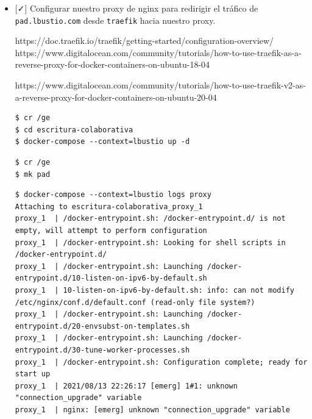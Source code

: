 \documentclass[
  12,
]{scrartcl}
\DeclareRobustCommand{\href}[2]{#2\footnote{\url{#1}}}
\begin{document}
\begin{itemize}
  \begin{itemize}
  \item
    {[}✓{]} El proxy de \texttt{nginx} debe
    \href{https://docs.hedgedoc.org/guides/reverse-proxy/}{generar
    ciertos encabezados para funcionar apropiadamente} (/ge 100c31a)
  \item
    {[}✗{]} Generar un contenedor \texttt{certbot} y compartir la
    configuración de certificados para que \texttt{nginx} use los
    certificados.
  \end{itemize}
\item
  {[}✓{]} Configurar nuestro proxy de nginx para redirigir el tráfico de
  \texttt{pad.lbustio.com} desde \texttt{traefik} hacia nuestro proxy.

  https://doc.traefik.io/traefik/getting-started/configuration-overview/
  https://www.digitalocean.com/community/tutorials/how-to-use-traefik-as-a-reverse-proxy-for-docker-containers-on-ubuntu-18-04

  https://www.digitalocean.com/community/tutorials/how-to-use-traefik-v2-as-a-reverse-proxy-for-docker-containers-on-ubuntu-20-04

\begin{verbatim}
$ cr /ge
$ cd escritura-colaborativa
$ docker-compose --context=lbustio up -d
\end{verbatim}

\begin{verbatim}
$ cr /ge
$ mk pad
\end{verbatim}

\begin{verbatim}
$ docker-compose --context=lbustio logs proxy
Attaching to escritura-colaborativa_proxy_1
proxy_1  | /docker-entrypoint.sh: /docker-entrypoint.d/ is not empty, will attempt to perform configuration
proxy_1  | /docker-entrypoint.sh: Looking for shell scripts in /docker-entrypoint.d/
proxy_1  | /docker-entrypoint.sh: Launching /docker-entrypoint.d/10-listen-on-ipv6-by-default.sh
proxy_1  | 10-listen-on-ipv6-by-default.sh: info: can not modify /etc/nginx/conf.d/default.conf (read-only file system?)
proxy_1  | /docker-entrypoint.sh: Launching /docker-entrypoint.d/20-envsubst-on-templates.sh
proxy_1  | /docker-entrypoint.sh: Launching /docker-entrypoint.d/30-tune-worker-processes.sh
proxy_1  | /docker-entrypoint.sh: Configuration complete; ready for start up
proxy_1  | 2021/08/13 22:26:17 [emerg] 1#1: unknown "connection_upgrade" variable
proxy_1  | nginx: [emerg] unknown "connection_upgrade" variable
\end{verbatim}


\end{itemize}
\end{document}
